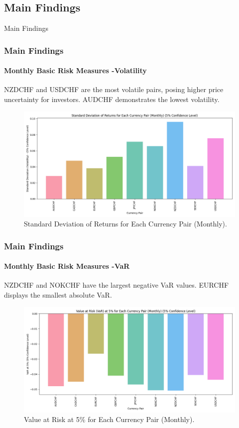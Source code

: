 \documentclass[10pt]{beamer}
\begin{document}
\begin{frame}
\section{Main Findings}
\centering \LARGE Main Findings
\end{frame}
\begin{frame}
\frametitle{Main Findings}
\framesubtitle{Monthly Basic Risk Measures -Volatility}
NZDCHF and USDCHF are the most
volatile pairs, posing higher price uncertainty for investors. AUDCHF demonstrates the lowest volatility.
\begin{figure}[h]
    \centering   \includegraphics[width=0.9\linewidth]{../../reports/figures/volatility_plot.png}
    \caption{\footnotesize Standard Deviation of Returns for Each Currency Pair (Monthly).}
    \label{fig:volatility_plot}
\end{figure}
\end{frame}
\begin{frame}
\frametitle{Main Findings}
\framesubtitle{Monthly Basic Risk Measures -VaR}
NZDCHF and NOKCHF have the largest negative VaR values. EURCHF displays the smallest absolute VaR.
\begin{figure}[h]
    \centering   \includegraphics[width=0.9\linewidth]{../../reports/figures/VaR_5_percent_plot.png}
    \caption{\footnotesize Value at Risk at 5\% for Each Currency Pair (Monthly).}
    \label{fig:monthly_var_plot}
\end{figure}
\end{frame}
\end{document}
